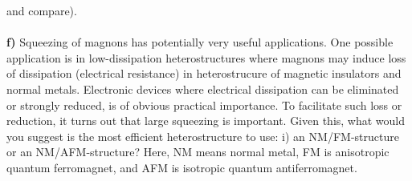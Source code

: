 \documentclass{article}
\begin{document}
and compare). 
\ \\
\ \\
{\bf f)} Squeezing of magnons has potentially very useful applications. One possible application is in low-dissipation heterostructures where magnons may induce loss of dissipation (electrical resistance) in heterostrucure of magnetic insulators and normal metals.  Electronic devices where electrical dissipation can be eliminated or strongly reduced, is of obvious practical importance. To facilitate such loss or reduction, it turns out that large squeezing is important. Given this, what would you suggest is the most efficient heterostructure to use: i) an NM/FM-structure or an NM/AFM-structure? Here, NM means normal metal, FM is anisotropic quantum ferromagnet, and AFM is isotropic quantum antiferromagnet.    
\end{document}
